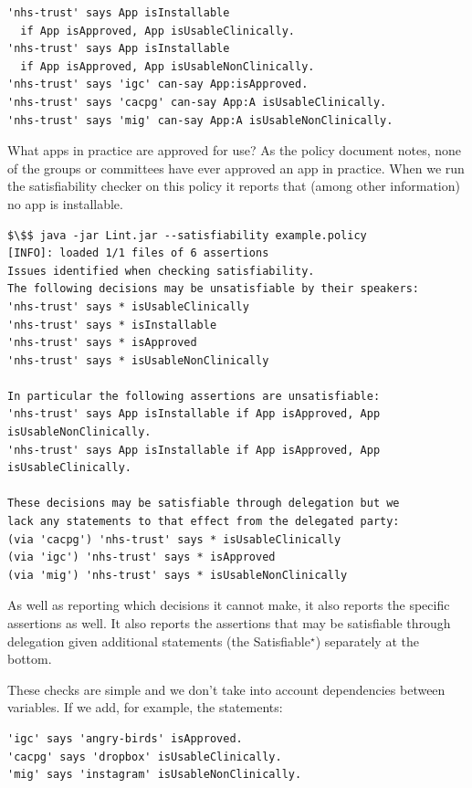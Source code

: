 \documentclass[thesis.tex]{subfiles}
\begin{document}
\begin{lstlisting}
'nhs-trust' says App isInstallable
  if App isApproved, App isUsableClinically.
'nhs-trust' says App isInstallable
  if App isApproved, App isUsableNonClinically.
'nhs-trust' says 'igc' can-say App:isApproved.
'nhs-trust' says 'cacpg' can-say App:A isUsableClinically.
'nhs-trust' says 'mig' can-say App:A isUsableNonClinically.
\end{lstlisting}

What apps in practice are approved for use?
As the policy document notes, none of the groups or committees have ever
approved an app in practice.
When we run the satisfiability checker on this policy
it reports that (among other information) no app is installable.

\noindent\begin{minipage}{\textwidth}
\begin{lstlisting}
$\$$ java -jar Lint.jar --satisfiability example.policy
[INFO]: loaded 1/1 files of 6 assertions
Issues identified when checking satisfiability.
The following decisions may be unsatisfiable by their speakers:
'nhs-trust' says * isUsableClinically
'nhs-trust' says * isInstallable
'nhs-trust' says * isApproved
'nhs-trust' says * isUsableNonClinically

In particular the following assertions are unsatisfiable:
'nhs-trust' says App isInstallable if App isApproved, App isUsableNonClinically.
'nhs-trust' says App isInstallable if App isApproved, App isUsableClinically.

These decisions may be satisfiable through delegation but we
lack any statements to that effect from the delegated party:
(via 'cacpg') 'nhs-trust' says * isUsableClinically
(via 'igc') 'nhs-trust' says * isApproved
(via 'mig') 'nhs-trust' says * isUsableNonClinically
\end{lstlisting}
\end{minipage}

As well as reporting which decisions it cannot make, it also reports the
specific assertions as well. It also reports the assertions that may be
satisfiable through delegation given additional statements (the
Satisfiable$^\star$) separately at the bottom.

These checks are simple and we don't take into
account dependencies between variables. If we add, for example, the statements:

\begin{lstlisting}
'igc' says 'angry-birds' isApproved.
'cacpg' says 'dropbox' isUsableClinically.
'mig' says 'instagram' isUsableNonClinically.
\end{lstlisting}
\end{document}
